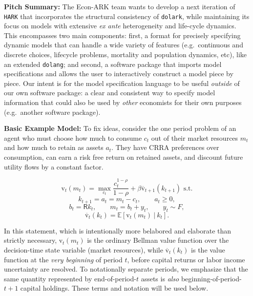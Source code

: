 \documentclass[12pt,pdftex,letterpaper]{article}
\newcommand{\E}{\mathbb{E}}
\newcommand{\vFunc}{\text{v}}
\begin{document}
\noindent \textbf{Pitch Summary:} The Econ-ARK team wants to develop a next iteration of \texttt{HARK} that incorporates the structural consistency of \texttt{dolark}, while maintaining its focus on models with extensive \textit{ex ante} heterogeneity and life-cycle dynamics. This encompasses two main components: first, a format for precisely specifying dynamic models that can handle a wide variety of features (e.g.\ continuous and discrete choices, lifecycle problems, mortality and population dynamics, etc), like an extended \texttt{dolang}; and second, a software package that imports model specifications and allows the user to interactively construct a model piece by piece. Our intent is for the model specification language to be useful \textit{outside} of our own software package: a clear and consistent way to specify model information that could also be used by \textit{other} economists for their own purposes (e.g.\ another software package).

\vspace{0.35cm}

\noindent \textbf{Basic Example Model:} To fix ideas, consider the one period problem of an agent who must choose how much to consume $c_t$ out of their market resources $m_t$ and how much to retain as assets $a_t$. They have CRRA preferences over consumption, can earn a risk free return on retained assets, and discount future utility flows by a constant factor.

\begin{equation*}
\vFunc_{t}(m_t) = \max_{c_t} \frac{c_t^{1-\rho}}{1-\rho} + \beta \overline{\vFunc}_{t+1}(k_{t+1}) \text{ s.t.}
\end{equation*}
\begin{equation*}
 k_{t+1} = a_t = m_t - c_t, \qquad a_t \geq 0,
\end{equation*}
\begin{equation*}
b_t = \mathsf{R} k_t, \qquad m_t = b_t + y_t, \qquad y_t \sim F,
\end{equation*}
\begin{equation*}
\overline{\vFunc}_t(k_t) = \E[\vFunc_t(m_t) ~|~ k_t].
\end{equation*}

In this statement, which is intentionally more belabored and elaborate than strictly necessary, $\vFunc_t(m_t)$ is the ordinary Bellman value function over the decision-time state variable (market resources), while $\overline{\vFunc}_{t}(k_t)$ is the value function at the \textit{very beginning} of period $t$, before capital returns or labor income uncertainty are resolved. To notationally separate periods, we emphasize that the same quantity represented by end-of-period-$t$ assets is \textit{also} beginning-of-period-$t+1$ capital holdings. These terms and notation will be used below.
\end{document}
